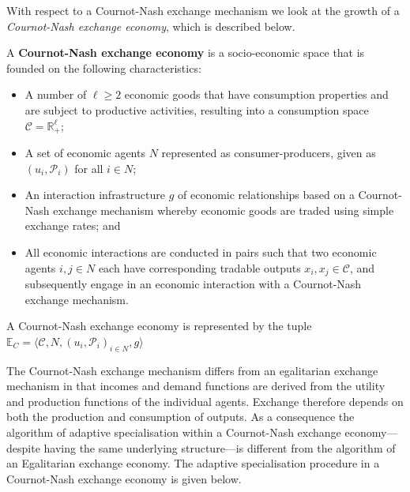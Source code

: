 With respect to a Cournot-Nash exchange mechanism we look at the growth of a \emph{Cournot-Nash exchange economy}, which is described below.
\begin{definition}
A \textbf{Cournot-Nash exchange economy} is a socio-economic space that is founded on the following characteristics:
\begin{itemize}
	\item A number of $\ell \geqslant 2$ economic goods that have consumption properties and are subject to productive activities, resulting into a consumption space $\mathcal{C} = \mathbb{R}^{\ell}_{+}$;

	\item A set of economic agents $N$ represented as consumer-producers, given as $\left( u_{i}, \mathcal{P}_{i} \right)$ for all $i \in N$;

	\item An interaction infrastructure $g$ of economic relationships based on a Cournot-Nash exchange mechanism whereby economic goods are traded using simple exchange rates; and

	\item All economic interactions are conducted in pairs such that two economic agents $i,j \in N$ each have corresponding tradable outputs $x_{i}, x_{j} \in \mathcal{C}$, and subsequently engage in an economic interaction with a Cournot-Nash exchange mechanism.
\end{itemize}
A Cournot-Nash exchange economy is represented by the tuple $\mathbb{E}_{C} = \big \langle \mathcal{C}, N, (u_{i}, \mathcal{P}_{i})_{i \in N}, g \big \rangle$
\end{definition}

The Cournot-Nash exchange mechanism differs from an egalitarian exchange mechanism in that incomes and demand functions are derived from the utility and production functions of the individual agents. Exchange therefore depends on both the production and consumption of outputs. As a consequence the algorithm of adaptive specialisation within a Cournot-Nash exchange economy---despite having the same underlying structure---is different from the algorithm of an Egalitarian exchange economy. The adaptive specialisation procedure in a Cournot-Nash exchange economy is given below.


